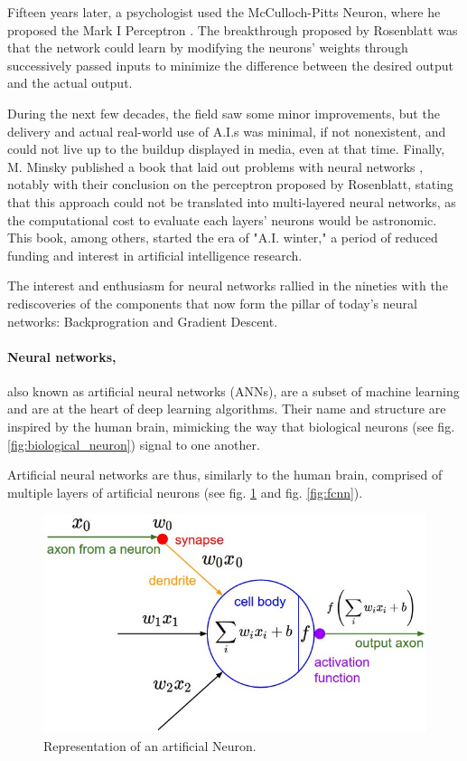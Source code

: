 Fifteen years later, a psychologist used the McCulloch-Pitts Neuron, where he
proposed the Mark I Perceptron \cite{brain_perceptron_1958}. The breakthrough
proposed by Rosenblatt was that the network could learn by modifying the
neurons' weights through successively passed inputs to minimize the difference
between the desired output and the actual output.

During the next few decades, the field saw some minor improvements, but the
delivery and actual real-world use of A.I.s was minimal, if not nonexistent, and
could not live up to the buildup displayed in media, even at that time. Finally,
M. Minsky published a book that laid out problems with neural networks
\cite{minsky_perceptrons_1969}, notably with their conclusion on the perceptron
proposed by Rosenblatt, stating that this approach could not be translated into
multi-layered neural networks, as the computational cost to evaluate each
layers' neurons would be astronomic. This book, among others, started the era of
"A.I. winter," a period of reduced funding and interest in artificial
intelligence research.

The interest and enthusiasm for neural networks rallied in the nineties with the
rediscoveries of the components that now form the pillar of today's neural
networks: Backprogration and Gradient Descent.


\paragraph{Neural networks,} also known as artificial neural networks (ANNs),
are a subset of machine learning and are at the heart of deep learning
algorithms. Their name and structure are inspired by the human brain, mimicking
the way that biological neurons (see fig. \ref{fig:biological_neuron}) signal to
one another.

Artificial neural networks are thus, similarly to the human brain, comprised of
multiple layers of artificial neurons (see fig. \ref{fig:artificial_neuron} and
fig. \ref{fig:fcnn}).

\begin{figure}[ht]
    \includegraphics[clip,width=1\columnwidth]{Figures/related/artificial_neuron.jpeg}
    \caption{ Representation of an artificial Neuron. }
    \label{fig:artificial_neuron}
\end{figure}

